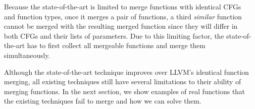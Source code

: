 Because the state-of-the-art is limited to merge functions with identical CFGs
and function types, once it merges a pair of functions, a third
\textit{similar} function cannot be merged with the resulting merged function
since they will differ in both CFGs and their lists of parameters.
Due to this limiting factor, the state-of-the-art has to first collect all
mergeable functions and merge them simultaneously.

Although the state-of-the-art technique improves over LLVM's identical
function merging, all existing techniques still have several limitations to
their ability of merging functions.
In the next section, we show examples of real functions that the existing
techniques fail to merge and how we can solve them.
